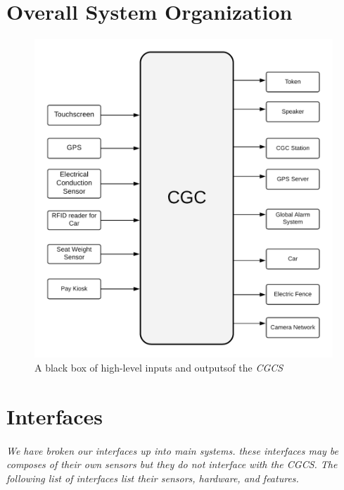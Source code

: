 \documentclass[12pt]{article}
\begin{document}
\section{Overall System Organization} 
\label{sys}

    \begin{figure}[H]
  		\centerline{\includegraphics[scale=.25]{CGCBlackBox.png}}
  		\caption{A black box of high-level inputs and outputsof the \textit{CGCS}}
  		\label{fig:blackbox}
	\end{figure}


\vfill
\pagebreak



\section{Interfaces} %
\label{int}
\paragraph{} \textit{We have broken our interfaces up into main systems. these interfaces may be composes of their own sensors but they do not interface with the CGCS. The following list of interfaces list their sensors, hardware, and features.}
\end{document}
